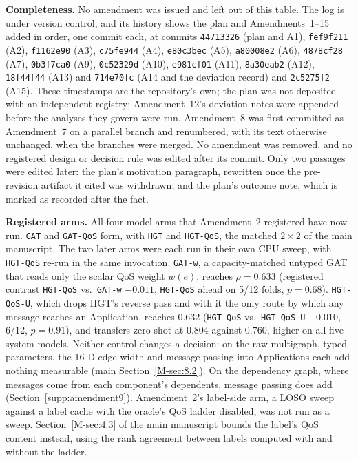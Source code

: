 \documentclass[preprint,3p]{elsarticle}
\begin{document}
\noindent\textbf{Completeness.} No amendment was issued and left out of this table. The log is under version control, and its history shows the plan and Amendments~1--15 added in order, one commit each, at commits \texttt{44713326} (plan and A1), \texttt{fef9f211} (A2), \texttt{f1162e90} (A3), \texttt{c75fe944} (A4), \texttt{e80c3bec} (A5), \texttt{a80008e2} (A6), \texttt{4878cf28} (A7), \texttt{0b3f7ca0} (A9), \texttt{0c52329d} (A10), \texttt{e981cf01} (A11), \texttt{8a30eab2} (A12), \texttt{18f44f44} (A13) and \texttt{714e70fc} (A14 and the deviation record) and \texttt{2c5275f2} (A15). These timestamps are the repository's own; the plan was not deposited with an independent registry; Amendment~12's deviation notes were appended before the analyses they govern were run. Amendment~8 was first committed as Amendment~7 on a parallel branch and renumbered, with its text otherwise unchanged, when the branches were merged. No amendment was removed, and no registered design or decision rule was edited after its commit. Only two passages were edited later: the plan's motivation paragraph, rewritten once the pre-revision artifact it cited was withdrawn, and the plan's outcome note, which is marked as recorded after the fact.

\noindent\textbf{Registered arms.} All four model arms that Amendment~2 registered have now run. \texttt{GAT} and \texttt{GAT-QoS} form, with \texttt{HGT} and \texttt{HGT-QoS}, the matched $2\times2$ of the main manuscript. The two later arms were each run in their own CPU sweep, with \texttt{HGT-QoS} re-run in the same invocation. \texttt{GAT-w}, a capacity-matched untyped GAT that reads only the scalar QoS weight $w(e)$, reaches $\rho = 0.633$ (registered contrast \texttt{HGT-QoS} vs.\ \texttt{GAT-w} $-0.011$, \texttt{HGT-QoS} ahead on 5/12 folds, $p = 0.68$). \texttt{HGT-QoS-U}, which drops HGT's reverse pass and with it the only route by which any message reaches an Application, reaches $0.632$ (\texttt{HGT-QoS} vs.\ \texttt{HGT-QoS-U} $-0.010$, 6/12, $p = 0.91$), and transfers zero-shot at $0.804$ against $0.760$, higher on all five system models. Neither control changes a decision: on the raw multigraph, typed parameters, the 16-D edge width and message passing into Applications each add nothing measurable (main Section~\ref{M-sec:8.2}). On the dependency graph, where messages come from each component's dependents, message passing does add (Section~\ref{supp:amendment9}). Amendment~2's label-side arm, a LOSO sweep against a label cache with the oracle's QoS ladder disabled, was not run as a sweep. Section~\ref{M-sec:4.3} of the main manuscript bounds the label's QoS content instead, using the rank agreement between labels computed with and without the ladder.
\end{document}
